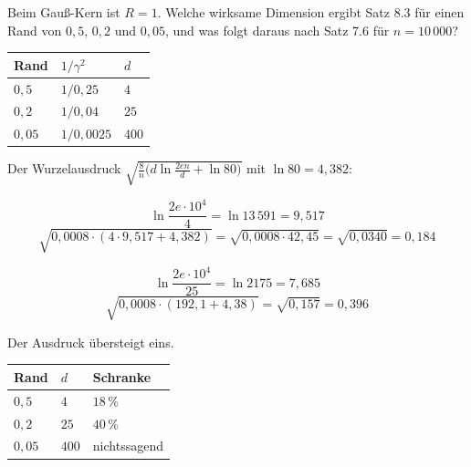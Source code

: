 \begin{aufgabe}
Beim Gauß-Kern ist $R = 1$. Welche wirksame Dimension ergibt Satz 8.3 für einen Rand von $0{,}5$, $0{,}2$ und $0{,}05$, und was folgt daraus nach Satz 7.6 für $n = 10\,000$?

\loesung
{}
\begin{center}
{\small
\renewcommand{\arraystretch}{1.48}
\begin{tabular}{@{}P{2.0cm}P{2.6cm}P{2.0cm}@{}}
\toprule
\textbf{Rand} & $1/\gamma^{2}$ & $d$\\
\midrule
$0{,}5$ & $1/0{,}25$ & $4$\\
$0{,}2$ & $1/0{,}04$ & $25$\\
$0{,}05$ & $1/0{,}0025$ & $400$\\
\bottomrule
\end{tabular}}
\end{center}

Der Wurzelausdruck $\sqrt{\frac{8}{n}\bigl(d\ln\frac{2en}{d} + \ln80\bigr)}$ mit $\ln80 = 4{,}382$:

\[ \ln\frac{2e\cdot10^{4}}{4} = \ln13\,591 = 9{,}517 \]
\[ \sqrt{0{,}0008\cdot(4\cdot9{,}517 + 4{,}382)} = \sqrt{0{,}0008\cdot42{,}45} = \sqrt{0{,}0340} = 0{,}184 \]

\[ \ln\frac{2e\cdot10^{4}}{25} = \ln2175 = 7{,}685 \]
\[ \sqrt{0{,}0008\cdot(192{,}1 + 4{,}38)} = \sqrt{0{,}157} = 0{,}396 \]

 Der Ausdruck übersteigt eins.

\begin{center}
{\small
\renewcommand{\arraystretch}{1.48}
\begin{tabular}{@{}P{2.0cm}P{1.6cm}P{2.6cm}@{}}
\toprule
\textbf{Rand} & $d$ & \textbf{Schranke}\\
\midrule
$0{,}5$ & $4$ & $18\,\%$\\
$0{,}2$ & $25$ & $40\,\%$\\
$0{,}05$ & $400$ & nichtssagend\\
\bottomrule
\end{tabular}}
\end{center}

\begin{center}
\begin{minipage}{0.88\textwidth}
\end{minipage}
\end{center}
\end{aufgabe}

